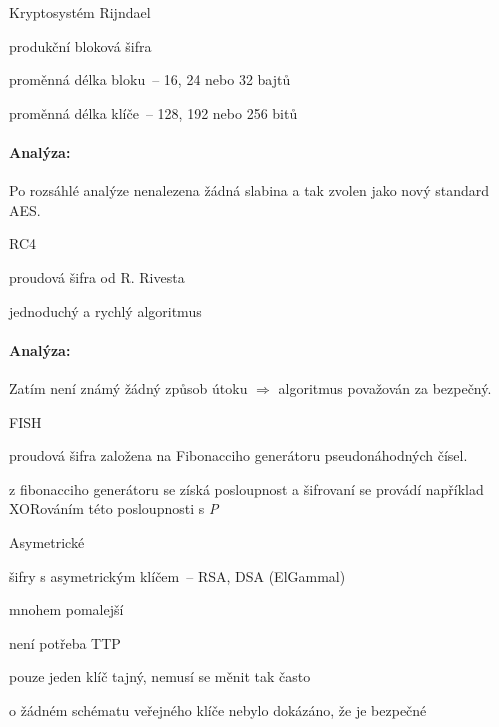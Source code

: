 \begin{obecne}{Kryptosystém Rijndael}
  \begin{pitemize}
    \item produkční bloková šifra
    \item proměnná délka bloku~-- 16, 24 nebo 32 bajtů
    \item proměnná délka klíče~-- 128, 192 nebo 256 bitů
  \end{pitemize}

  \paragraph{Analýza:} Po rozsáhlé analýze nenalezena žádná slabina a tak
  zvolen jako nový standard AES.
\end{obecne}

\begin{obecne}{RC4}
  \begin{pitemize}
    \item proudová šifra od R. Rivesta
    \item jednoduchý a rychlý algoritmus 

    \paragraph{Analýza:} Zatím není známý žádný způsob útoku $\Rightarrow$
    algoritmus považován za bezpečný.
  \end{pitemize}
\end{obecne}

\begin{obecne}{FISH}
  \begin{pitemize}
    \item proudová šifra založena na Fibonacciho generátoru pseudonáhodných čísel.
    \item z fibonacciho generátoru se získá posloupnost a šifrovaní se provádí
    například XORováním této posloupnosti s \emph{P}
  \end{pitemize}
\end{obecne}

\begin{obecne}{Asymetrické}
  \begin{pitemize}
    \item šifry s asymetrickým klíčem~-- RSA, DSA (ElGammal)
    \item mnohem pomalejší
    \item není potřeba TTP
    \item pouze jeden klíč tajný, nemusí se měnit tak často
    \item o žádném schématu veřejného klíče nebylo dokázáno, že je bezpečné
  \end{pitemize}
\end{obecne}

